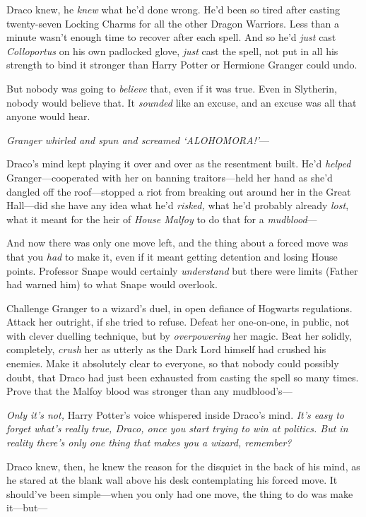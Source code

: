 Draco knew, he \emph{knew} what he'd done wrong. He'd been so tired
after casting twenty-seven Locking Charms for all the other Dragon
Warriors. Less than a minute wasn't enough time to recover after each
spell. And so he'd \emph{just} cast \emph{Colloportus} on his own
padlocked glove, \emph{just} cast the spell, not put in all his strength
to bind it stronger than Harry Potter or Hermione Granger could undo.

But nobody was going to \emph{believe} that, even if it was true. Even
in Slytherin, nobody would believe that. It \emph{sounded} like an
excuse, and an excuse was all that anyone would hear.

\emph{Granger whirled and spun and screamed `ALOHOMORA!'}---

Draco's mind kept playing it over and over as the resentment built. He'd
\emph{helped} Granger---cooperated with her on banning traitors---held
her hand as she'd dangled off the roof---stopped a riot from breaking
out around her in the Great Hall---did she have any idea what he'd
\emph{risked,} what he'd probably already \emph{lost}, what it meant for
the heir of \emph{House Malfoy} to do that for a \emph{mudblood}---

And now there was only one move left, and the thing about a forced move
was that you \emph{had} to make it, even if it meant getting detention
and losing House points. Professor Snape would certainly
\emph{understand} but there were limits (Father had warned him) to what
Snape would overlook.

Challenge Granger to a wizard's duel, in open defiance of Hogwarts
regulations. Attack her outright, if she tried to refuse. Defeat her
one-on-one, in public, not with clever duelling technique, but by
\emph{overpowering} her magic. Beat her solidly, completely,
\emph{crush} her as utterly as the Dark Lord himself had crushed his
enemies. Make it absolutely clear to everyone, so that nobody could
possibly doubt, that Draco had just been exhausted from casting the
spell so many times. Prove that the Malfoy blood was stronger than any
mudblood's---

\emph{Only it's not,} Harry Potter's voice whispered inside Draco's
mind. \emph{It's easy to forget what's really true, Draco, once you
start trying to win at politics. But in reality there's only one thing
that makes you a wizard, remember?}

Draco knew, then, he knew the reason for the disquiet in the back of his
mind, as he stared at the blank wall above his desk contemplating his
forced move. It should've been simple---when you only had one move, the
thing to do was make it---but---

